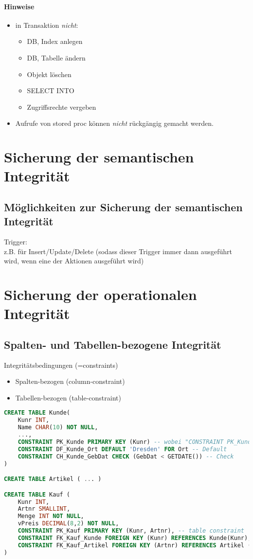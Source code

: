 \paragraph{Hinweise}
\begin{itemize}
\item in Transaktion \emph{nicht}:
\begin{itemize}
\item DB, Index anlegen
\item DB, Tabelle ändern
\item Objekt löschen
\item SELECT INTO
\item Zugriffsrechte vergeben
\end{itemize}
\item Aufrufe von stored proc können \emph{nicht} rückgängig gemacht werden.
\end{itemize}

\section{Sicherung der semantischen Integrität}
\subsection{Möglichkeiten zur Sicherung der semantischen Integrität}
Trigger:\\
z.B. für Insert/Update/Delete (sodass dieser Trigger immer dann ausgeführt wird, wenn eine der Aktionen ausgeführt wird)


\section{Sicherung der operationalen Integrität}

\subsection{Spalten- und Tabellen-bezogene Integrität}

Integritätsbedingungen (=constraints)
\begin{itemize}
\item Spalten-bezogen (column-constraint)
\item Tabellen-bezogen (table-constraint)
\end{itemize}
\begin{lstlisting}[language=SQL]
CREATE TABLE Kunde(
	Kunr INT,
	Name CHAR(10) NOT NULL,
	...,
	CONSTRAINT PK_Kunde PRIMARY KEY (Kunr) -- wobei "CONSTRAINT PK_Kunde" optional ist
	CONSTRAINT DF_Kunde_Ort DEFAULT 'Dresden' FOR Ort -- Default
	CONSTRAINT CH_Kunde_GebDat CHECK (GebDat < GETDATE()) -- Check
)

CREATE TABLE Artikel ( ... )

CREATE TABLE Kauf (
	Kunr INT,
	Artnr SMALLINT,
	Menge INT NOT NULL,
	vPreis DECIMAL(8,2) NOT NULL,
	CONSTRAINT PK_Kauf PRIMARY KEY (Kunr, Artnr), -- table constraint
	CONSTRAINT FK_Kauf_Kunde FOREIGN KEY (Kunr) REFERENCES Kunde(Kunr),
	CONSTRAINT FK_Kauf_Artikel FOREIGN KEY (Artnr) REFERENCES Artikel (Artnr)
)
\end{lstlisting}
